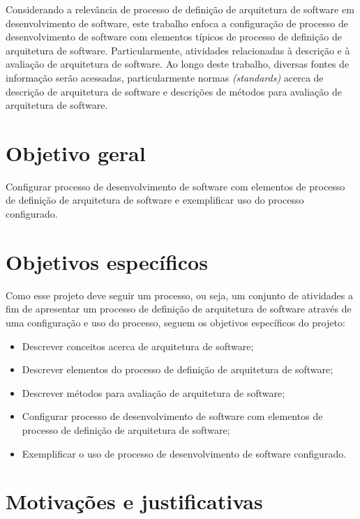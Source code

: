 Considerando a relevância de processo de definição de arquitetura de software em desenvolvimento de software, este trabalho enfoca a configuração de processo de desenvolvimento de software com elementos típicos de processo de definição de arquitetura de software. Particularmente, atividades relacionadas à descrição e à avaliação de arquitetura de software. Ao longo deste trabalho, diversas fontes de informação serão acessadas, particularmente normas \emph{(standards)} acerca de descrição de arquitetura de software e descrições de métodos para avaliação de arquitetura de software.



\section{Objetivo geral}

Configurar processo de desenvolvimento de software com elementos de processo de definição de arquitetura de software e exemplificar uso do processo configurado.

\section{Objetivos específicos}

Como esse projeto deve seguir um processo, ou seja, um conjunto de atividades a fim de apresentar um processo de definição de arquitetura de software através de uma configuração e uso do processo, seguem os objetivos específicos do projeto: 

\begin{itemize}
    \item Descrever  conceitos acerca de arquitetura de software;
    \item Descrever elementos do processo de definição de arquitetura de software;
    \item Descrever métodos para avaliação de arquitetura de software;
    \item Configurar processo de desenvolvimento de software com elementos de processo de definição de arquitetura de software;
    \item Exemplificar o uso de processo de desenvolvimento de software configurado.
\end{itemize}

\section{Motivações e justificativas}

